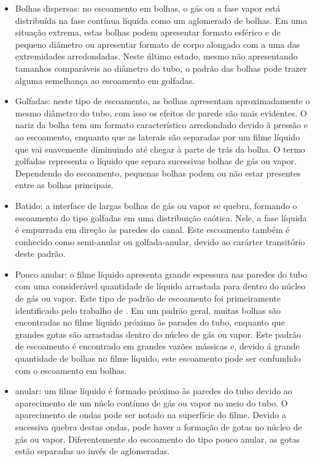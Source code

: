 \begin{itemize}
	\item Bolhas dispersas: no escoamento em bolhas, o gás ou a fase
	vapor está distribuída na fase contínua líquida como um aglomerado
	de bolhas. Em uma situação extrema, estas bolhas podem apresentar
	formato esférico e de pequeno diâmetro ou apresentar formato de
	corpo alongado com a uma das extremidades arredondadas. Neste último
	estado, mesmo não apresentando tamanhos comparáveis ao diâmetro do
	tubo, o padrão das bolhas pode trazer alguma semelhança ao
	escoamento em golfadas.
	\item Golfadas: neste tipo de escoamento, as bolhas apresentam
	aproximadamente o mesmo diâmetro do tubo, com isso os efeitos de
	parede são mais evidentes. O nariz da bolha tem um formato
	característico arredondado devido à pressão e ao escoamento,
	enquanto que as laterais são separadas por um filme líquido que vai
	suavemente diminuindo até chegar à parte de trás da bolha. O termo
	golfadas representa o líquido que separa sucessivas bolhas de gás ou
	vapor. Dependendo do escoamento, pequenas bolhas podem ou não estar
	presentes entre as bolhas principais.
	\item Batido: a interface de largas bolhas de gás ou vapor se
	quebra, formando o escoamento do tipo golfadas em uma distribuição
	caótica. Nele, a fase líquida é empurrada em direção às paredes do
	canal. Este escoamento também é conhecido como semi-anular ou
	golfada-anular, devido ao carárter transitório deste padrão.
	\item Pouco anular: o filme líquido apresenta grande espessura nas
	paredes do tubo com uma considerável quantidade de líquido arrastada
	para dentro do núcleo de gás ou vapor. Este tipo de padrão de
	escoamento foi primeiramente identificado pelo trabalho de
	\cite{hewitt1970}. Em um padrão geral, muitas bolhas são encontradas
	no filme líquido próximo às parades do tubo, enquanto que grandes
	gotas são arrastadas dentro do núcleo de gás ou vapor. Este padrão
	de escoamento é encontrado em grandes vazões mássicas e, devido á
	grande quantidade de bolhas no filme líquido, este escoamento pode
	ser confundido com o escoamento em bolhas. 
	\item anular: um filme líquido é formado próximo às paredes do tubo
	devido ao aparecimento de um núclo contínuo de gás ou vapor no meio
	do tubo. O aparecimento de ondas pode ser notado na superfície do
	filme. Devido a sucessiva quebra destas ondas, pode haver a formação
	de gotas no núcleo de gás ou vapor. Diferentemente do escoamento do
	tipo pouco anular, as gotas estão separadas ao invés de aglomeradas.
\end{itemize}

